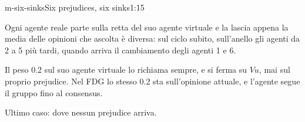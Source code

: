 \begin{slidedue}{m-six-sinks}{Six prejudices, six sinks}{1:15}
\begin{discorso}
    \item Ogni agente reale parte sulla retta del suo agente virtuale e la lascia appena la media delle opinioni che ascolta è diversa: sul ciclo subito, sull'anello gli agenti da 2 a 5 più tardi, quando arriva il cambiamento degli agenti 1 e 6.
    \item Il peso 0.2 sul suo agente virtuale lo richiama sempre, e si ferma su $Vu$, mai sul proprio {\color{red}} {\color{blue}prejudice.} Nel FDG lo stesso 0.2 sta sull'opinione attuale, e l'agente segue il gruppo fino al {\color{red}} {\color{blue}consensus.}
    \item Ultimo caso: dove nessun {\color{red}} {\color{blue}prejudice} arriva.
  \end{discorso}
\end{slidedue}

